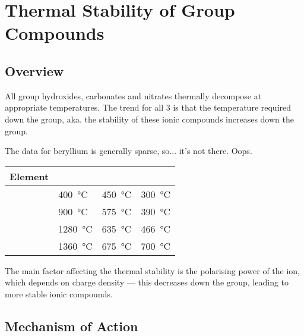 


	\section{Thermal Stability of Group  Compounds}

		\subsection{Overview}

			All group \rtwo{} hydroxides, carbonates and nitrates thermally decompose at appropriate
			temperatures. The trend for all 3 is that the temperature required  down
			the group, aka. the stability of these ionic compounds increases down the group.

			The data for beryllium is generally sparse, so... it's not there. Oops.

			\begin{center}\begin{table}[htb]\renewcommand{\arraystretch}{1.5}
			\begin{tabu} to \textwidth {X[c,m] | X[c,m] | X[c,m] | X[c,m]}

				Element		&		&		&		\\	\hline
						&	\SI{400}{\celsius}	&\SI{450}{\celsius}	&\SI{300}{\celsius}		\\	\hline
						&	\SI{900}{\celsius}	&\SI{575}{\celsius}	&\SI{390}{\celsius}		\\	\hline
						&	\SI{1280}{\celsius}	&\SI{635}{\celsius}	&\SI{466}{\celsius}		\\	\hline
						&	\SI{1360}{\celsius}	&\SI{675}{\celsius}	&\SI{700}{\celsius}		\\	\hline

			\end{tabu}
			\end{table}\end{center}\vspace{-10mm}

			The main factor affecting the thermal stability is the polarising power of the ion, which depends
			on charge density --- this decreases down the group, leading to more stable ionic compounds.



		\subsection{Mechanism of Action}

